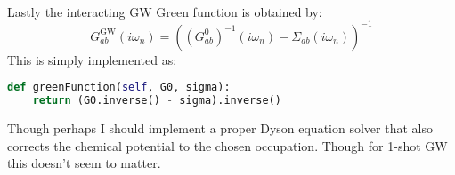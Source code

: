 \documentclass[12pt]{article}
\begin{document}
\\
Lastly the interacting GW Green function is obtained by:
\begin{equation}
G_{ab}^\text{GW}(i\omega_n)=((G^0_{ab})^{-1}(i\omega_n)-\Sigma_{ab}(i\omega_n))^{-1}
\end{equation}
This is simply implemented as:
\begin{lstlisting}[language=Python]
def greenFunction(self, G0, sigma):
    return (G0.inverse() - sigma).inverse()
\end{lstlisting}
Though perhaps I should implement a proper Dyson equation solver that also corrects the chemical potential to the chosen occupation. Though for 1-shot GW this doesn't seem to matter.
\end{document}
